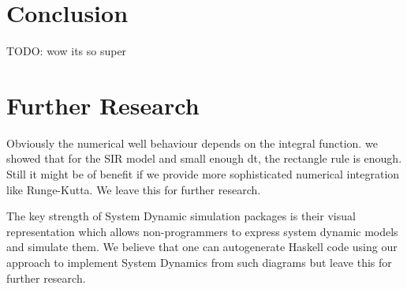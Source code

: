 \section{Conclusion}
TODO: wow its so super


\section{Further Research}
Obviously the numerical well behaviour depends on the integral function. we showed that for the SIR model and small enough dt, the rectangle rule is enough. Still it might be of benefit if we provide more  sophisticated numerical integration like Runge-Kutta. We leave this for further research.

The key strength of System Dynamic simulation packages is their visual representation which allows non-programmers to express system dynamic models and simulate them. We believe that one can autogenerate Haskell code using our approach to implement System Dynamics from such diagrams but leave this for further research.
